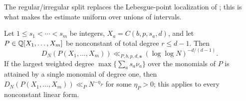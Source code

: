 \documentclass[11pt]{article}
\begin{document}
The regular/irregular split replaces the Lebesgue-point localization of ; this is what makes
the estimate uniform over unions of intervals.

\begin{theorem}\label{thm:severalrate}
Let $1\le s_1<\cdots<s_m$ be integers, $X_a=C(b,p,s_a,d)$, and let $P\in\mathbb Q[X_1,\ldots,X_m]$ be nonconstant of total
degree $r\le d-1$. Then
\[
D_N(P(X_1,\ldots,X_m))\ll_{P,b,p,d,\mathbf s}(\log\log N)^{-d/(d-1)} .
\]
If the largest weighted degree $\max\{\sum_as_a\nu_a\}$ over the monomials of $P$ is attained by a single monomial
of degree one, then $D_N(P(X_1,\ldots,X_m))\ll_PN^{-\eta_P}$ for some $\eta_P>0$; this applies to every nonconstant
linear form.
\end{theorem}
\end{document}
